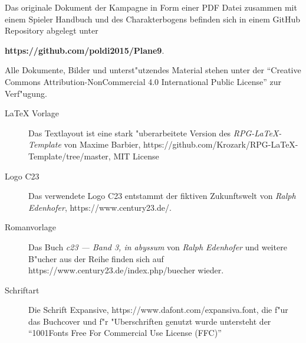 \newpage
\pagestyle{empty}



Das originale  Dokument der Kampagne in Form einer PDF Datei zusammen mit einem Spieler Handbuch und des Charakterbogens
befinden sich in einem GitHub Repository abgelegt unter 

\textbf{https://github.com/poldi2015/Plane9}. 

Alle Dokumente, Bilder und unterst"utzendes Material stehen unter der ``Creative Commons Attribution-NonCommercial 4.0 
International Public License'' zur Verf"ugung.


\begin{description}
    \item [LaTeX Vorlage] Das Textlayout ist eine stark "uberarbeitete Version des \textit{RPG-LaTeX-Template} von 
        Maxime Barbier, https://github.com/Krozark/RPG-LaTeX-Template/tree/master, MIT License
    \item [Logo C23] Das verwendete Logo C23 entstammt der fiktiven Zukunftswelt von \emph{Ralph  Edenhofer}, 
        \newline{}https://www.century23.de/.
    \item [Romanvorlage] Das Buch \emph{c23 --- Band 3, in abyssum} von \emph{Ralph Edenhofer} und weitere B"ucher aus der Reihe finden 
        sich auf https://www.century23.de/index.php/buecher wieder.
    \item [Schriftart] Die Schrift Expansive, https://www.dafont.com/expansiva.font, die f"ur das Buchcover und f"r
        "Uberschriften genutzt wurde untersteht der ``1001Fonts Free For Commercial Use License (FFC)''
\end{description}